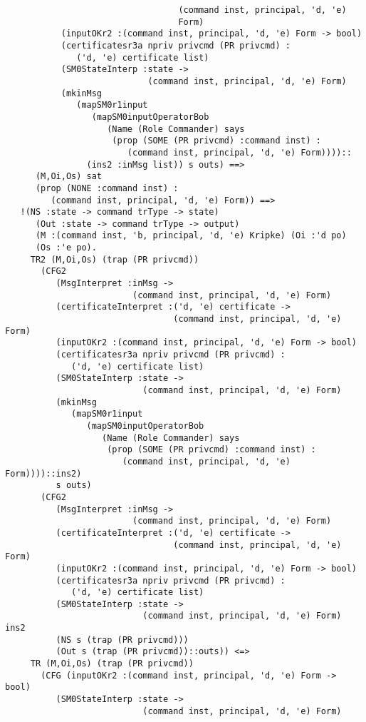 \documentclass{report}
\begin{document}
\begin{session}
\begin{scriptsize}
\begin{verbatim}
                                  (command inst, principal, 'd, 'e)
                                  Form)
           (inputOKr2 :(command inst, principal, 'd, 'e) Form -> bool)
           (certificatesr3a npriv privcmd (PR privcmd) :
              ('d, 'e) certificate list)
           (SM0StateInterp :state ->
                            (command inst, principal, 'd, 'e) Form)
           (mkinMsg
              (mapSM0r1input
                 (mapSM0inputOperatorBob
                    (Name (Role Commander) says
                     (prop (SOME (PR privcmd) :command inst) :
                        (command inst, principal, 'd, 'e) Form))))::
                (ins2 :inMsg list)) s outs) ==>
      (M,Oi,Os) sat
      (prop (NONE :command inst) :
         (command inst, principal, 'd, 'e) Form)) ==>
   !(NS :state -> command trType -> state)
      (Out :state -> command trType -> output)
      (M :(command inst, 'b, principal, 'd, 'e) Kripke) (Oi :'d po)
      (Os :'e po).
     TR2 (M,Oi,Os) (trap (PR privcmd))
       (CFG2
          (MsgInterpret :inMsg ->
                         (command inst, principal, 'd, 'e) Form)
          (certificateInterpret :('d, 'e) certificate ->
                                 (command inst, principal, 'd, 'e) Form)
          (inputOKr2 :(command inst, principal, 'd, 'e) Form -> bool)
          (certificatesr3a npriv privcmd (PR privcmd) :
             ('d, 'e) certificate list)
          (SM0StateInterp :state ->
                           (command inst, principal, 'd, 'e) Form)
          (mkinMsg
             (mapSM0r1input
                (mapSM0inputOperatorBob
                   (Name (Role Commander) says
                    (prop (SOME (PR privcmd) :command inst) :
                       (command inst, principal, 'd, 'e) Form))))::ins2)
          s outs)
       (CFG2
          (MsgInterpret :inMsg ->
                         (command inst, principal, 'd, 'e) Form)
          (certificateInterpret :('d, 'e) certificate ->
                                 (command inst, principal, 'd, 'e) Form)
          (inputOKr2 :(command inst, principal, 'd, 'e) Form -> bool)
          (certificatesr3a npriv privcmd (PR privcmd) :
             ('d, 'e) certificate list)
          (SM0StateInterp :state ->
                           (command inst, principal, 'd, 'e) Form) ins2
          (NS s (trap (PR privcmd)))
          (Out s (trap (PR privcmd))::outs)) <=>
     TR (M,Oi,Os) (trap (PR privcmd))
       (CFG (inputOKr2 :(command inst, principal, 'd, 'e) Form -> bool)
          (SM0StateInterp :state ->
                           (command inst, principal, 'd, 'e) Form)

\end{verbatim}
\end{scriptsize}
\end{session}
\end{document}
